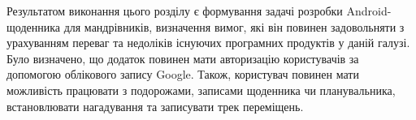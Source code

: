 \documentclass[../main.tex]{subfiles}
\begin{document}
Результатом виконання цього розділу є формування задачі розробки Android-щоденника для мандрівників, визначення вимог, які він повинен задовольняти з урахуванням переваг та недоліків існуючих програмних продуктів у даній галузі. Було визначено, що додаток повинен мати авторизацію користувачів за допомогою облікового запису Google. Також, користувач повинен мати можливість працювати з подорожами, записами щоденника чи планувальника, встановлювати нагадування та записувати трек переміщень.
\end{document}
